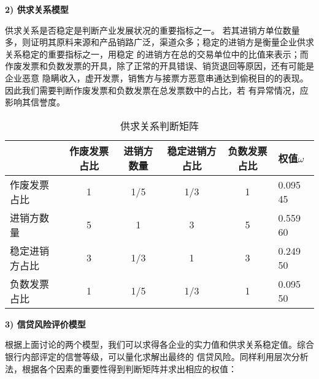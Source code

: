 \documentclass[withoutpreface,bwprint]{cumcmthesis}
\begin{document}
    \textbf{2) 供求关系模型}

    供求关系是否稳定是判断产业发展状况的重要指标之一。
    若其进销方单位数量多，则证明其原料来源和产品销路广泛，渠道众多；稳定的进销方是衡量企业供求关系稳定的重要指标之一，用稳定
    的进销方在总的交易单位中的比值来表示；而作废发票和负数发票的开具，除了正常的开具错误、销货退回等原因，还有可能是企业恶意
    隐瞒收入，虚开发票，销售方与接票方恶意串通达到偷税目的的表现。因此我们需要判断作废发票和负数发票在总发票数中的占比，若
    有异常情况，应影响其信誉度。

    \begin{table}[H]
        \caption{供求关系判断矩阵}\label{tab:004} 
        \raggedright
        \begin{tabular}{lccccl}
            \toprule[1.5pt]
             & 作废发票占比 & 进销方数量 & 稳定进销方占比 & 负数发票占比 & 权值$\omega$ \\
            \midrule[1pt]
            作废发票占比 & 1 & 1/5 & 1/3 & 1 & 0.095 45\\
            进销方数量 & 5 & 1 & 3 & 5 & 0.559 60\\
            稳定进销方占比 & 3 & 1/3 & 1 & 3 & 0.249 50\\
            负数发票占比 & 1 & 1/5 & 1/3 & 1 & 0.095 50\\
            \bottomrule[1.5pt]
        \end{tabular}
    \end{table}

    \textbf{3) 信贷风险评价模型}

    根据上面讨论的两个模型，我们可以求得各企业的实力值和供求关系稳定值。综合银行内部评定的信誉等级，可以量化求解出最终的
    信贷风险。同样利用层次分析法，根据各个因素的重要性得到判断矩阵并求出相应的权值：

    \begin{table}[!htbp]
        \caption{信贷风险指标判断矩阵}\label{tab:005} 
        \centering
    \end{table}
\end{document}
